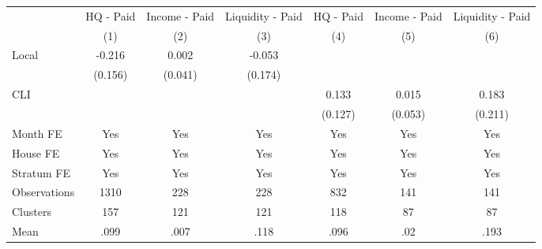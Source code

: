 {
\def\sym#1{\ifmmode^{#1}\else\(^{#1}\)\fi}
\begin{tabular}{l*{6}{c}}
\hline\hline
                &\multicolumn{1}{c}{HQ - Paid}&\multicolumn{1}{c}{Income - Paid}&\multicolumn{1}{c}{Liquidity - Paid}&\multicolumn{1}{c}{HQ - Paid}&\multicolumn{1}{c}{Income - Paid}&\multicolumn{1}{c}{Liquidity - Paid}\\
                &\multicolumn{1}{c}{(1)}         &\multicolumn{1}{c}{(2)}         &\multicolumn{1}{c}{(3)}         &\multicolumn{1}{c}{(4)}         &\multicolumn{1}{c}{(5)}         &\multicolumn{1}{c}{(6)}         \\
\hline
Local           &   -0.216         &    0.002         &   -0.053         &                  &                  &                  \\
                &  (0.156)         &  (0.041)         &  (0.174)         &                  &                  &                  \\
CLI             &                  &                  &                  &    0.133         &    0.015         &    0.183         \\
                &                  &                  &                  &  (0.127)         &  (0.053)         &  (0.211)         \\
Month FE        &      Yes         &      Yes         &      Yes         &      Yes         &      Yes         &      Yes         \\
House FE        &      Yes         &      Yes         &      Yes         &      Yes         &      Yes         &      Yes         \\
Stratum FE      &      Yes         &      Yes         &      Yes         &      Yes         &      Yes         &      Yes         \\
\hline
Observations    &     1310         &      228         &      228         &      832         &      141         &      141         \\
Clusters        &      157         &      121         &      121         &      118         &       87         &       87         \\
Mean            &     .099         &     .007         &     .118         &     .096         &      .02         &     .193         \\
\hline\hline
\end{tabular}
}
